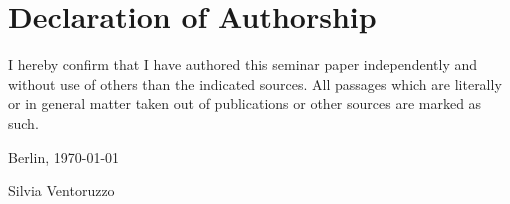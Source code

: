 
\section*{Declaration of Authorship}

I hereby confirm that I have authored this seminar paper independently and without use of others than the indicated
sources. All passages which are literally or in general matter
taken out of publications or other sources are marked as such.
\vspace{1cm}

Berlin, \today \vspace{0.5cm}

Silvia Ventoruzzo
